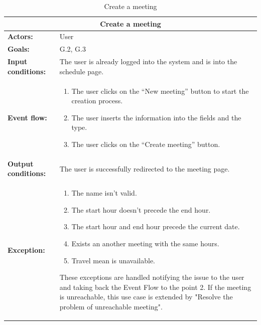 \begin{table}
\begin{tabular} { p{5cm} p{8cm} }  
\multicolumn{2}{c}{\textbf{Create a meeting}}\\
\hline
\textbf{Actors:} & User \\ 
\textbf{Goals:} & G.2, G.3 \\ 
\textbf{Input conditions:} & The user is already logged into the system and is into the schedule page. \\
\textbf{Event flow:} & \begin{enumerate}
				\item
				The user clicks on the “New meeting” button to start the creation process.
				\item
				The user inserts the information  into the fields and the type.
				\item
				The user clicks on the “Create meeting” button.
			\end{enumerate}\\ 
\textbf{Output conditions:} & The user is successfully redirected to the
meeting page.\\ 
\textbf{Exception:} & \begin{enumerate}
				\item
				The name isn’t valid.
				\item
				The start hour doesn’t precede the end hour.
				\item
				The start hour and end hour precede the current date.
				\item
				Exists an another meeting with the same hours. 
				\item
				Travel mean is unavailable. 
			\end{enumerate}
These exceptions are handled notifying the issue to the user and taking back the Event Flow to the point 2.
If the meeting is unreachable, this use case is extended by "Resolve the problem of unreachable meeting".
\\
\hline
\end{tabular}
\caption{Create a meeting}
\label{ref:createameeting}
\end{table}
\clearpage

